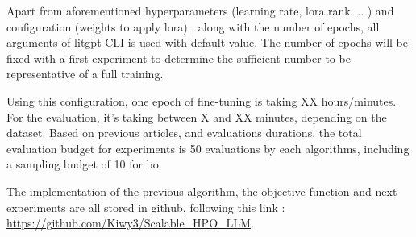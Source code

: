 Apart from aforementioned hyperparameters (learning rate, \acrshort{lora} rank ... ) and configuration (weights to apply \acrshort{lora}) , along with the number of epochs, all arguments of litgpt CLI is used with default value. The number of epochs will be fixed with a first experiment to determine the sufficient number to be representative of a full training. 

Using this configuration, one epoch of fine-tuning is taking XX hours/minutes. For the evaluation, it's taking between X and XX minutes, depending on the dataset. Based on previous articles, and evaluations durations, the total evaluation budget for experiments is 50 evaluations by each algorithms, including a sampling budget of 10 for \acrlong{bo}. 

The implementation of the previous algorithm, the objective function and next experiments are all stored in github, following this link : \href{https://github.com/Kiwy3/Scalable_HPO_LLM}{https://github.com/Kiwy3/Scalable\_HPO\_LLM}.